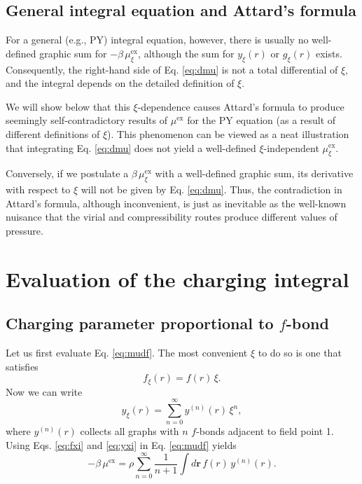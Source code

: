 \documentclass[preprint]{revtex4-1}
\newcommand{\vct}[1]{\mathbf{#1}}
\providecommand{\vr}{} %
\renewcommand{\vr}{\vct{r}}
\newcommand{\supex}[1]{ { { #1 }^{ \mathrm{ex} } } }
\newcommand{\muex}{\supex{\mu}}
\newcommand{\muexxi}{\mu^{ \mathrm{ex} }_\xi}
\begin{document}
\subsection{General integral equation and Attard's formula}



For a general (e.g., PY) integral equation, however,
there is usually no well-defined graphic sum for
$-\beta \, \muexxi$,
although the sum for $y_\xi(r)$ or $g_\xi(r)$ exists.
%
Consequently,
the right-hand side of Eq. \eqref{eq:dmu}
is not a total differential of $\xi$,
and the integral
depends on the detailed definition of $\xi$.




We will show below that this $\xi$-dependence
causes Attard's formula\cite{attard1991}
to produce seemingly self-contradictory results of $\muex$
for the PY equation
(as a result of different definitions of $\xi$).
%
This phenomenon can be viewed as a neat illustration that
integrating Eq. \eqref{eq:dmu} does not yield a well-defined $\xi$-independent $\muexxi$.



Conversely,
if we postulate a $\beta \, \muexxi$ with a well-defined graphic sum,
its derivative with respect to $\xi$
will not be given by Eq. \eqref{eq:dmu}.
%
Thus, the contradiction in Attard's formula,
although inconvenient, is just as inevitable as
the well-known nuisance that the virial and compressibility routes
produce different values of pressure.





\section{Evaluation of the charging integral}



\subsection{Charging parameter proportional to $f$-bond}



Let us first evaluate Eq. \eqref{eq:mudf}.
%
The most convenient $\xi$ to do so is one that satisfies
\begin{equation}
  f_\xi(r) = f(r) \, \xi.
  \label{eq:fxi}
\end{equation}
Now we can write
\begin{equation}
  y_\xi(r) = \sum_{n = 0}^\infty y^{(n)}(r) \, \xi^n,
\label{eq:yxi}
\end{equation}
where $y^{(n)}(r)$ collects all graphs
with $n$ $f$-bonds adjacent to field point 1.
%
Using Eqs. \eqref{eq:fxi} and \eqref{eq:yxi} in Eq. \eqref{eq:mudf} yields
\begin{equation}
  -\beta \, \muex
=
  \rho \sum_{n = 0}^\infty
  \frac{1}{n+1}
  \int d\vr \, f(r) \, y^{(n)}(r).
\label{eq:mu_fyseries}
\end{equation}
\end{document}
